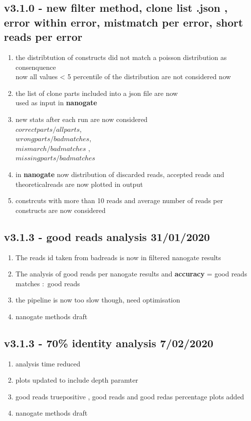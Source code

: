 \documentclass[11pt, a4paper]{article}
\begin{document}
\subsection{v3.1.0 - new filter method, clone list .json , error within error, mistmatch per error, short reads per error}
\begin{enumerate}
\item the distribtution of constructs did not match a poisson distribution as consenquence \\
now all values < 5 percentile of the distribution are not considered now
\item the list of clone parts included into a json file are now \\
used as input in \textbf{nanogate} \\
\item new stats after each run are now considered \\
$correct parts/all parts$,\\ 
$wrong parts/bad matches$,\\
$mismarch/bad matches$ ,\\ 
$missing parts/bad matches$ \\
\item in \textbf{nanogate} now distribution of discarded reads, accepted reads and theoreticalreads are now plotted in output
\item constrcuts with more than 10 reads and average number of reads per constructs are now considered
\end{enumerate}

\subsection{v3.1.3 - good reads analysis 31/01/2020}
\begin{enumerate}
\item The reads id taken from badreads is now in filtered nanogate results
\item The analysis of good reads per nanogate results and \textbf{accuracy} = good reads matches $:$ good reads
\item the pipeline is now too slow though, need optimisation
\item nanogate methods draft
\end{enumerate}


\subsection{v3.1.3 - 70\% identity analysis 7/02/2020}
\begin{enumerate}
\item analysis time reduced
\item plots updated to include depth paramter
\item good reads truepositive , good reads and good redas percentage plots added
\item nanogate methods draft
\end{enumerate}
\end{document}
